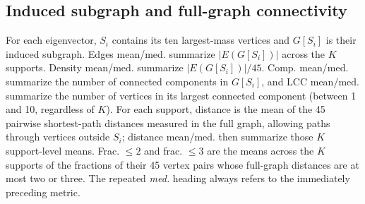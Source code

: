 \documentclass[10pt,letterpaper]{article}
\begin{document}
\subsection{Induced subgraph and full-graph connectivity}
For each eigenvector, $S_i$ contains its ten largest-mass vertices and $G[S_i]$ is their induced
subgraph. Edges mean/med. summarize $|E(G[S_i])|$ across the $K$ supports. Density mean/med.
summarize $|E(G[S_i])|/45$. Comp. mean/med. summarize the number of connected components in
$G[S_i]$, and LCC mean/med. summarize the number of vertices in its largest connected component
(between 1 and 10, regardless of $K$). For each support, distance is the mean of the 45 pairwise
shortest-path distances measured in the full graph, allowing paths through vertices outside $S_i$;
distance mean/med. then summarize those $K$ support-level means. Frac. $\leq2$ and frac. $\leq3$
are the means across the $K$ supports of the fractions of their 45 vertex pairs whose full-graph
distances are at most two or three. The repeated \emph{med.} heading always refers to the immediately
preceding metric.
\end{document}
